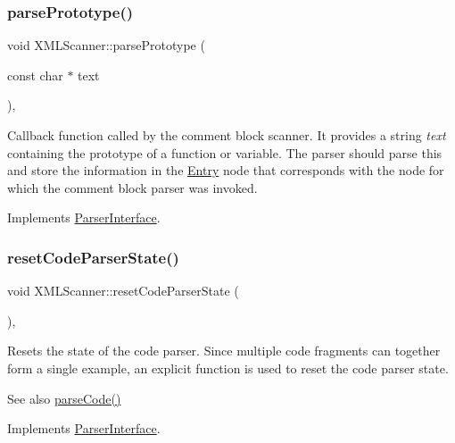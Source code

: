 \subsubsection{\texorpdfstring{parsePrototype()}{parsePrototype()}}
{\footnotesize\ttfamily void X\+M\+L\+Scanner\+::parse\+Prototype (\begin{DoxyParamCaption}\item[{const char $\ast$}]{text }\end{DoxyParamCaption})\hspace{0.3cm}{\ttfamily [inline]}, {\ttfamily [virtual]}}

Callback function called by the comment block scanner. It provides a string {\itshape text} containing the prototype of a function or variable. The parser should parse this and store the information in the \mbox{\hyperlink{class_entry}{Entry}} node that corresponds with the node for which the comment block parser was invoked. 

Implements \mbox{\hyperlink{class_parser_interface_a5ebf0f524a296845befa22c85a4cc80b}{Parser\+Interface}}.

\mbox{\label{class_x_m_l_scanner_a77da43900e68df9a111eb45546d94fd4}} 
\subsubsection{\texorpdfstring{resetCodeParserState()}{resetCodeParserState()}}
{\footnotesize\ttfamily void X\+M\+L\+Scanner\+::reset\+Code\+Parser\+State (\begin{DoxyParamCaption}{ }\end{DoxyParamCaption})\hspace{0.3cm}{\ttfamily [inline]}, {\ttfamily [virtual]}}

Resets the state of the code parser. Since multiple code fragments can together form a single example, an explicit function is used to reset the code parser state. \begin{DoxySeeAlso}{See also}
\mbox{\hyperlink{class_x_m_l_scanner_a63895d17bafedb76a06399c80eecd840}{parse\+Code()}} 
\end{DoxySeeAlso}


Implements \mbox{\hyperlink{class_parser_interface_aee4fccd1865a4e8a6b9f2896811104ca}{Parser\+Interface}}.

